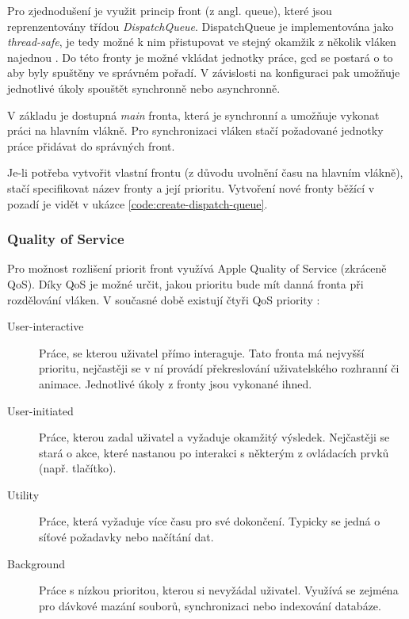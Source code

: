 Pro zjednodušení je využit princip front (z angl. queue), které jsou reprenzentovány třídou \textit{DispatchQueue}.
DispatchQueue je implementována jako \textit{thread-safe}, je tedy možné k nim přistupovat ve stejný okamžik z několik vláken najednou \cite{apple-concurrency-programming-guide}.
Do této fronty je možné vkládat jednotky práce, \acrshort{gcd} se postará o to aby byly spuštěny ve správném pořadí.
V závislosti na konfiguraci pak umožňuje jednotlivé úkoly spouštět synchronně nebo asynchronně.

V základu je dostupná \textit{main} fronta, která je synchronní a umožňuje vykonat práci na hlavním vlákně.
Pro synchronizaci vláken stačí požadované jednotky práce přidávat do správných front.

Je-li potřeba vytvořit vlastní frontu (z důvodu uvolnění času na hlavním vlákně), stačí specifikovat název fronty a její prioritu.
Vytvoření nové fronty běžící v pozadí je vidět v ukázce \ref{code:create-dispatch-queue}.


\subsubsection*{Quality of Service}

Pro možnost rozlišení priorit front využívá Apple Quality of Service (zkráceně QoS).
Díky QoS je možné určit, jakou prioritu bude mít danná fronta při rozdělování vláken.
V současné době existují čtyři QoS priority \cite{apple-prioritize-work-with-qos}:

\begin{description}
  \item[User-interactive] Práce, se kterou uživatel přímo interaguje.
  Tato fronta má nejvyšší prioritu, nejčastěji se v ní provádí překreslování uživatelského rozhranní či animace.
  Jednotlivé úkoly z fronty jsou vykonané ihned.
  \item[User-initiated] Práce, kterou zadal uživatel a vyžaduje okamžitý výsledek.
  Nejčastěji se stará o akce, které nastanou po interakci s některým z ovládacích prvků (např. tlačítko).
  \item[Utility] Práce, která vyžaduje více času pro své dokončení.
  Typicky se jedná o síťové požadavky nebo načítání dat.
  \item[Background] Práce s nízkou prioritou, kterou si nevyžádal uživatel.
  Využívá se zejména pro dávkové mazání souborů, synchronizaci nebo indexování databáze.
\end{description}

